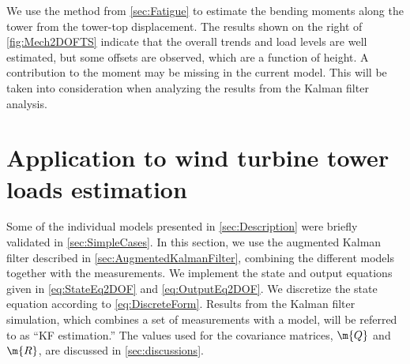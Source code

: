 \documentclass[wes, manuscript]{copernicus}
\begin{document}
We use the method from \autoref{sec:Fatigue} to estimate the bending moments along the tower from the tower-top displacement. The results shown on the right of \autoref{fig:Mech2DOFTS} indicate that the overall trends and load levels are well estimated, but some offsets are observed, which are a function of height. A contribution to the moment may be missing in the current model. This will be taken into consideration when analyzing the results from the Kalman filter analysis.
















\section{Application to wind turbine tower loads estimation}
\label{sec:FullCases}
Some of the individual models presented in \autoref{sec:Description} were briefly validated in \autoref{sec:SimpleCases}. In this section, we use the augmented Kalman filter described in \autoref{sec:AugmentedKalmanFilter}, combining the different models together with the measurements. We implement the state and output equations given in \autoref{eq:StateEq2DOF} and \autoref{eq:OutputEq2DOF}. We discretize the state equation according to \autoref{eq:DiscreteForm}.
Results from the Kalman filter simulation, which combines a set of measurements with a model, will be referred to as ``KF estimation.''
The values used for the covariance matrices, $\m{Q}$ and $\m{R}$, are discussed in \autoref{sec:discussions}.
\end{document}
